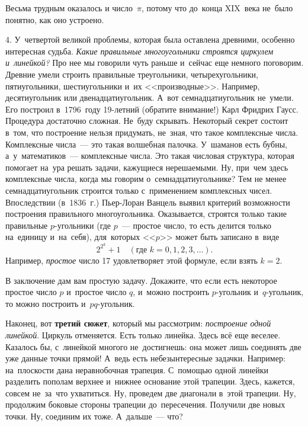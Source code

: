 \pagebreak

Весьма трудным оказалось и число~$\pi$, потому что до~конца XIX~века не~было понятно, как
оно устроено.

4. У~четвертой великой проблемы, которая была оставлена древними, особенно интересная судьба. \textit{Какие
правильные многоугольники строятся циркулем и~линейкой?} Про нее мы говорили чуть раньше
и~сейчас еще немного поговорим.
 Древние умели строить правильные треугольники, четырехугольники,
пятиугольники, шестиугольники и~их <<производные>>. Например, десятиугольник или двенадцатиугольник.
А~вот семнадцатиугольник не~умели. Его построил в~1796~году 19-летний (обратите внимание!) Карл
Фридрих Гаусс. Процедура достаточно сложная. Не~буду скрывать. Некоторый секрет состоит в~том, что
построение нельзя придумать, не~зная, что такое комплексные числа. Комплексные числа~--- это такая
волшебная палочка. У~шаманов есть бубны, а~у~математиков~--- комплексные числа. Это такая числовая
структура, которая помогает на~ура решать задачи, кажущиеся нерешаемыми. Ну, при~чем здесь
комплексные числа, когда мы говорим о~семнадцатиугольнике? Тем не менее семнадцатиугольник строится
только с~применением комплексных чисел. Впоследствии (в~1836~г.) Пьер-Лоран Ванцель выявил критерий возможности построения
правильного многоугольника.
 Оказывается, строятся только такие правильные
$p$-угольники (где $p$~--- простое число, то есть делится только на~единицу и~на~себя), для~которых
<<$p$>> может быть записано в~виде
$$
2^{2^{k}}+1\quad
(\text{где }
k= 0, 1, 2, 3, \ldots).
$$
Например, \textit{простое} число 17 удовлетворяет этой формуле, если взять $k=2$.

В заключение дам вам простую задачу. Докажите, что если есть некоторое простое число $p$ и~простое число $q$, и~можно
построить $p$-угольник и~$q$-угольник, то можно построить и~$pq$-угольник.

Наконец, вот \textbf{третий сюжет}, который мы рассмотрим: \textit{построение одной линейкой}. Циркуль отменяется. Есть только
линейка. Здесь всё еще веселее. Казалось бы, с~линейкой многого не~достигнешь: она может лишь
соединять две уже данные точки прямой! А~ведь есть небезынтересные задачки. Например:
на~плоскости дана неравнобочная трапеция. С~помощью одной линейки разделить пополам верхнее
и~нижнее основание этой трапеции. Здесь, кажется, совсем не~за~что ухватиться. Ну, проведем две
диагонали в~этой трапеции. Ну, продолжим боковые стороны трапеции до~пересечения. Получили две
новых точки. Ну, соединим их тоже. А~дальше~--- что?

